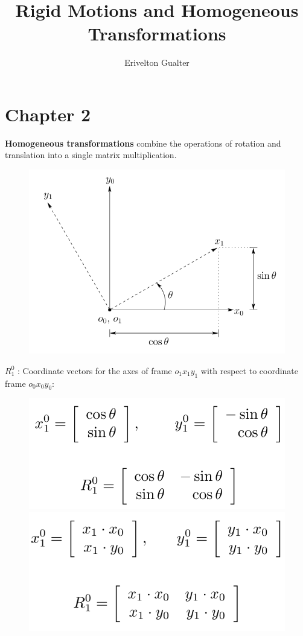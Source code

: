 \documentclass[a4paper,10pt,twocolumn]{article}
\title{Rigid Motions and Homogeneous Transformations}
\author{Erivelton Gualter}
\begin{document}
\date{}
\maketitle


\section*{Chapter 2}

\textbf{Homogeneous transformations} combine the operations of rotation and translation into a single matrix multiplication.

\begin{figure}[H]
\centering
 \includegraphics[width=0.8\linewidth]{ch2-coordinate.png}
\end{figure}

$R^0_1$ : Coordinate vectors for the axes of frame $o_1x_1y_1$ with respect to coordinate frame $o_0x_0y_0$:

\begin{figure}[H]
\centering
 \includegraphics[width=.7\linewidth]{Rotation2D.png}
 \includegraphics[width=.7\linewidth]{Rotation2D2.png}
\end{figure}
\end{document}
